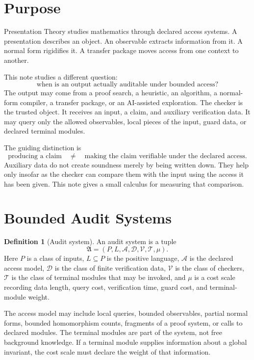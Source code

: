 \documentclass[11pt]{article}
\theoremstyle{definition}
\newtheorem{definition}[theorem]{Definition}
\begin{document}
\section{Purpose}

Presentation Theory studies mathematics through declared access systems. A presentation describes an object. An observable extracts information from it. A normal form rigidifies it. A transfer package moves access from one context to another.

This note studies a different question:
\[
\text{when is an output actually auditable under bounded access?}
\]
The output may come from a proof search, a heuristic, an algorithm, a normal-form compiler, a transfer package, or an AI-assisted exploration. The checker is the trusted object. It receives an input, a claim, and auxiliary verification data. It may query only the allowed observables, local pieces of the input, guard data, or declared terminal modules.

The guiding distinction is
\[
\text{producing a claim}
\quad\neq\quad
\text{making the claim verifiable under the declared access}.
\]
Auxiliary data do not create soundness merely by being written down. They help only insofar as the checker can compare them with the input using the access it has been given. This note gives a small calculus for measuring that comparison.

\section{Bounded Audit Systems}

\begin{definition}[Audit system]
An audit system is a tuple
\[
\mathfrak A=(P,L,\mathcal A,\mathcal D,\mathcal V,\mathcal T,\mu).
\]
Here \(P\) is a class of inputs, \(L\subseteq P\) is the positive language, \(\mathcal A\) is the declared access model, \(\mathcal D\) is the class of finite verification data, \(\mathcal V\) is the class of checkers, \(\mathcal T\) is the class of terminal modules that may be invoked, and \(\mu\) is a cost scale recording data length, query cost, verification time, guard cost, and terminal-module weight.
\end{definition}

The access model may include local queries, bounded observables, partial normal forms, bounded homomorphism counts, fragments of a proof system, or calls to declared modules. The terminal modules are part of the system, not free background knowledge. If a terminal module supplies information about a global invariant, the cost scale must declare the weight of that information.
\end{document}
